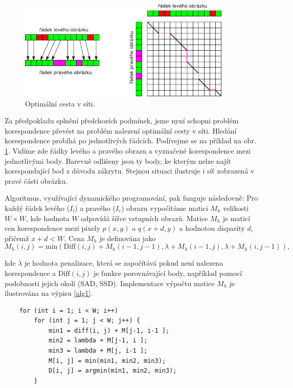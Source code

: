 \begin{figure}[htb]
    \centering
    \includegraphics[width=4in]{11_stereo/images/stereo}
    \caption{Optimální cesta v síti.}
    \label{img:stereo}
\end{figure}

Za předpokladu splnění předchozích podmínek, jsme nyní schopni problém korespondence 
 převést na problém nalezení optimální cesty v síti. Hledání korespondence probíhá po jednotlivých řádcích. Podívejme se na příklad na obr. \ref{img:stereo}. Vidíme zde řádky levého a pravého obrazu a vyznačené korespondence mezi jednotlivými body. Barevně odlišeny jsou ty body, ke kterým nelze najít korespondující bod z důvodu zákrytu. Stejnou situaci ilustruje i síť zobrazená v pravé části obrázku.

Algoritmus, využívající dynamického programování, pak funguje následovně: Pro každý řádek levého ($I_{l}$) a pravého ($I_{r}$) obrazu vypočítáme matici $M_{h}$ velikosti $W \times W$, kde hodnota $W$ odpovídá šířce vstupních obrazů.
Matice $M_{h}$ je maticí cen korespondence mezi pixely $p(x,y)$ a $q(x + d,y)$ a hodnotou disparity $d$, přičemž $x + d < W$. Cena $M_{h}$ je definována jako  
\begin{equation}
    \label{cena}
    M_{h}(i,j) = \mbox{min}( \mbox{Diff}(i,j) + M_{h}(i-1, j-1), \lambda + M_{h}(i-1, j), \lambda + M_{h}(i, j-1)),
\end{equation}

kde $\lambda$ je hodnota penalizace, která se započítává pokud není nalezena korespondence a $\mbox{Diff}(i,j)$ je funkce porovnávající body, například pomocí podobnosti jejich okolí (SAD, SSD). Implementace výpočtu matice $M_{h}$ je ilustrována na výpisu \ref{alg1}.

\begin{lstlisting}
    for (int i = 1; i < W; i++)
        for (int j = 1; j < W; j++) {
            min1 = diff(i, j) + M[j-1, i-1 ];
            min2 = lambda + M[j-1, i ];
            min3 = lambda + M[j, i-1 ];
            M[i, j] = min(min1, min2, min3);
            D[i, j] = argmin(min1, min2, min3);
        }
\end{lstlisting}

